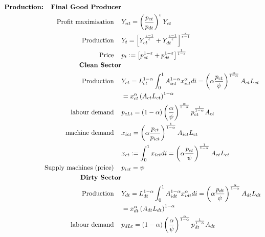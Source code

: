 \begin{align}
\text{\textbf{Production:}} \hspace{4mm}
\text{\textbf{Final Good Producer}}&\\
\text{Profit maximisation}\hspace{4mm} & Y_{nt}=\left(\frac{p_{ct}}{p_{dt}}\right)^\varepsilon Y_{ct}\\
\text{Production}\hspace{4mm} & Y_t=\left[Y_{ct}^{\frac{\varepsilon-1}{\varepsilon}}+Y_{dt}^{\frac{\varepsilon-1}{\varepsilon}}\right]^{\frac{\varepsilon}{\varepsilon-1}}\\
\text{Price}\hspace{4mm}& p_t:=\left[p_{ct}^{1-\varepsilon}+p_{dt}^{1-\varepsilon}\right]^{\frac{1}{1-\varepsilon}}\\
\text{\textbf{Clean Sector}}\\
\text{Production}\hspace{4mm}& Y_{ct}=L^{1-\alpha}_{ct}\int_{0}^{1}A^{1-\alpha}_{ict}x_{ict}^{\alpha}di=  \left(\alpha\frac{p_{ct}}{\psi}\right)^{\frac{\alpha}{1-\alpha}}A_{ct} L_{ct} \label{eqbm:outputc}
\\ & =x_{ct}^{\alpha}\left(A_{ct}L_{ct}\right)^{1-\alpha} \\ 
\text{labour demand}\hspace{4mm} & p_{cLt} =
(1-\alpha)\left(\frac{\alpha}{\psi}\right)^\frac{\alpha}{1- \alpha}p_{ct}^\frac{1}{1-\alpha}A_{ct} \label{eqbm:labc} \\
\text{machine demand}\hspace{4mm} & x_{ict} = \left(\alpha\frac{ p_{ct}}{p_{ict}}\right)^\frac{1}{1-\alpha}A_{ict}L_{ct}\\
& x_{ct}:=\int_{0}^{1}x_{ict} di= \left(\alpha\frac{p_{ct}}{\psi}\right)^\frac{1}{1-\alpha}A_{ct}L_{ct}\\
%
\text{Supply machines (price)}\hspace{4mm}& p_{ict}=\psi \\
%
\text{\textbf{Dirty Sector}}\\
\text{Production}\hspace{4mm} & Y_{dt}=L^{1-\alpha}_{dt}\int_{0}^{1}A^{1-\alpha}_{idt}x_{idt}^{\alpha}di=  \left(\alpha\frac{p_{dt}}{\psi}\right)^{\frac{\alpha}{1-\alpha}}A_{dt} L_{dt}\label{eqbm:outputd}\\ & =x_{dt}^{\alpha}\left(A_{dt}L_{dt}\right)^{1-\alpha} \\ 
\text{labour demand}\hspace{4mm} & p_{dLt} =
(1-\alpha)\left(\frac{\alpha}{\psi}\right)^\frac{\alpha}{1- \alpha}p_{dt}^\frac{1}{1-\alpha}A_{dt}\label{eqbm:labd}\\

\end{align}
